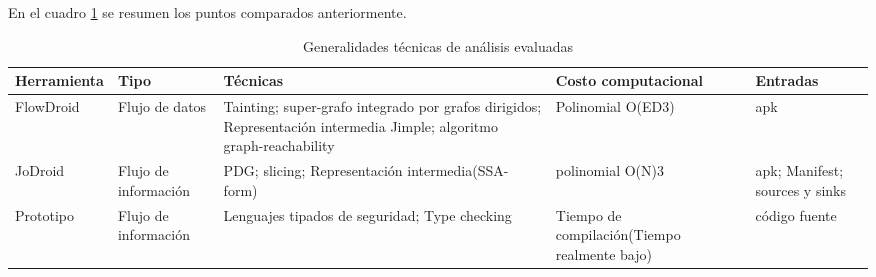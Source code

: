 En el cuadro \ref{tab:comparacion} se resumen los puntos comparados
anteriormente.
\begin{table}[H]
\begin{center}
\small\addtolength{\tabcolsep}{-3pt}
\begin{tabular}{|p{}|p{}|p{5cm}|p{2cm}|p{2cm}|}
	\hline
	\textbf{Herramienta} & \textbf{Tipo} & \textbf{Técnicas} & \textbf{Costo
	computacional} & \textbf{ Entradas} \\
	\hline
	FlowDroid & Flujo de datos & 
	Tainting; super-grafo integrado por grafos dirigidos; Representación intermedia
	Jimple; algoritmo graph-reachability & Polinomial
	O(ED3)\cite{Graph-reachability} & apk\\
	\hline
	JoDroid & Flujo de información & PDG; slicing; Representación intermedia(SSA-
	form) & polinomial O(N)3\cite{FCO-PDG} & apk; Manifest; sources y sinks
	\\
	\hline
	Prototipo & Flujo de información  & Lenguajes tipados de seguridad; Type
	checking & Tiempo de compilación(Tiempo realmente bajo) & código fuente
	\\
	\hline
\end{tabular}
\end{center}
\caption{Generalidades técnicas de análisis evaluadas}
\label{tab:comparacion}
\end{table}	
